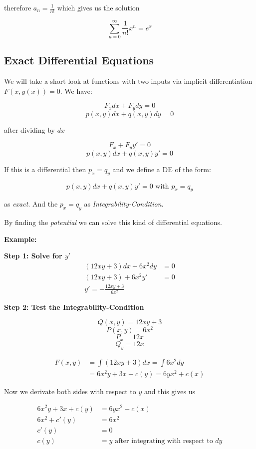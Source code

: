 therefore \(a_n = \frac{1}{n!}\) which gives us the solution

\[\sum_{n = 0}^{\infty}\frac{1}{n!}x^n = e^x\]

\subsection{Exact Differential Equations}

We will take a short look at functions with two inputs via implicit differentiation \(F(x,y(x)) = 0\).
We have:

\[
F_x dx + F_y dy = 0
\]
\[
p(x,y)dx + q(x,y)dy = 0
\]

after dividing by \(dx\)

\[
F_x + F_y y' = 0
\]
\[
p(x,y)dx + q(x,y)y' = 0
\]

If this is a differential then \(p_x = q_y\) and we define a DE of the form:

\[
p(x,y)dx + q(x,y)y' = 0 \text{ with } p_x = q_y
\]

as \emph{exact}. And the \(p_x = q_y\) as \emph{Integrability-Condition}.
\vspace{\baselineskip}

By finding the \emph{potential} we can solve this kind of differential equations.
\vspace{\baselineskip}

\textbf{Example:}
\vspace{\baselineskip}

\textbf{Step 1: Solve for \(y'\)}
\begin{align*}
    (12xy + 3)dx + 6x^2dy &= 0\\
    (12xy + 3) + 6x^2 y' &= 0\\
    y' = - \frac{12xy + 3}{6x^2}
\end{align*}

\textbf{Step 2: Test the Integrability-Condition}

\[Q(x,y) = 12xy + 3\]
\[P(x,y) = 6x^2\] 
\[P_x = 12x\]
\[Q_y = 12x\]

\begin{align*}
F(x,y) &= \int (12xy + 3)dx = \int 6x^2 dy\\
       &= 6x^2 y + 3x + c(y) = 6yx^2 + c(x)
\end{align*}

Now we derivate both sides with respect to \(y\) and this gives us

\begin{align*}
    6x^2y + 3x + c(y) &= 6yx^2 + c(x) \\
    6x^2 + c'(y) &= 6x^2 \\
           c'(y) &= 0 \\
            c(y) &= y \text{ after integrating with respect to } dy
\end{align*}

